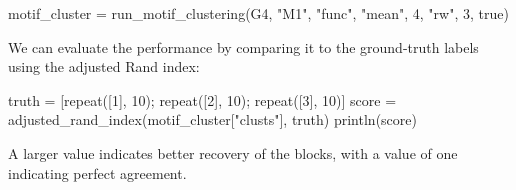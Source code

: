 \documentclass{article}
\begin{document}
\begin{tcolorbox}[colback=black!5!white,colframe=black!15!white]
\begin{juliablock}
motif_cluster = run_motif_clustering(G4, "M1", "func",
                                     "mean", 4, "rw", 3, true)
\end{juliablock}
\end{tcolorbox}

We can evaluate the performance by comparing it to the ground-truth
labels using the adjusted Rand index:

\begin{tcolorbox}[colback=black!5!white,colframe=black!15!white]
\begin{juliablock}
truth = [repeat([1], 10); repeat([2], 10); repeat([3], 10)]
score = adjusted_rand_index(motif_cluster["clusts"], truth)
println(score)
\end{juliablock}
\texttt{\obeylines\printpythontex}
\end{tcolorbox}

A larger value indicates better recovery of the blocks,
with a value of one indicating perfect agreement.



\end{document}
